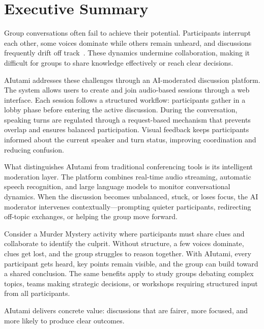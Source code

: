 \chapter{Executive Summary}

Group conversations often fail to achieve their potential. Participants interrupt each other, some voices dominate while others remain unheard, and discussions frequently drift off track~\cite{Diehl1987ProductionBlocking}. These dynamics undermine collaboration, making it difficult for groups to share knowledge effectively or reach clear decisions.

AIutami addresses these challenges through an AI-moderated discussion platform. The system allows users to create and join audio-based sessions through a web interface. Each session follows a structured workflow: participants gather in a lobby phase before entering the active discussion. During the conversation, speaking turns are regulated through a request-based mechanism that prevents overlap and ensures balanced participation. Visual feedback keeps participants informed about the current speaker and turn status, improving coordination and reducing confusion.

What distinguishes AIutami from traditional conferencing tools is its intelligent moderation layer. The platform combines real-time audio streaming, automatic speech recognition, and large language models to monitor conversational dynamics. When the discussion becomes unbalanced, stuck, or loses focus, the AI moderator intervenes contextually---prompting quieter participants, redirecting off-topic exchanges, or helping the group move forward.

Consider a Murder Mystery activity where participants must share clues and collaborate to identify the culprit. Without structure, a few voices dominate, clues get lost, and the group struggles to reason together. With AIutami, every participant gets heard, key points remain visible, and the group can build toward a shared conclusion. The same benefits apply to study groups debating complex topics, teams making strategic decisions, or workshops requiring structured input from all participants.

AIutami delivers concrete value: discussions that are fairer, more focused, and more likely to produce clear outcomes.
